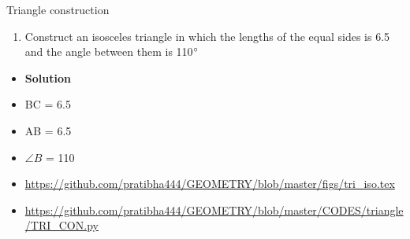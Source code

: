 \begin{frame}{Triangle construction}
\begin{enumerate}
\conti
\item Construct an isosceles triangle in which the lengths of the equal sides is 6.5 and the angle between them is 110$\degree$
\seti
\end{enumerate}
\begin{itemize}
\item\textbf{Solution}\\

\item BC = 6.5\\
\item AB = 6.5\\
\item $\angle B$ = 110\\ 
\end{itemize}
\end{frame}

\begin{frame}
\begin{itemize}
\item \url{https://github.com/pratibha444/GEOMETRY/blob/master/figs/tri_iso.tex}
\item \url{https://github.com/pratibha444/GEOMETRY/blob/master/CODES/triangle/TRI_CON.py}
\end{itemize}
\end{frame}